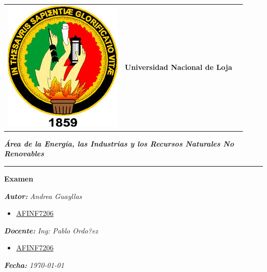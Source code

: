 \documentclass[a4paper,openright,12pt]{report}
\begin{document}
\pagestyle{fancy}
\renewcommand{\headrulewidth}{0pt}
\bigskip
\bigskip


{\setlength{\arrayrulewidth}{0.5mm}
\begin{tabular}{p{2 cm} | p{10
cm} p{3 cm}}
\multirow{3}{2cm}{\Large{\includegraphics[width=1.9 cm]{logtipo}}} 

& \Large{\textbf{Universidad Nacional de Loja}} \\

\end{tabular}
\bigskip
\bigskip

\begin{flushleft}


\raggedright{ 
\small{\textit{\textbf{Área de la Energía, las Industrias y los Recursos Naturales No Renovables}}}
}
\thinspace
\rule{1\textwidth}{0.04cm} 
\thinspace
{}
\end{flushleft}
\bigskip
\bigskip
\bigskip
\bigskip
\bigskip

\begin{center}
\textbf{Examen }
\end{center}


\begin{flushleft}
\textit{\textbf{Autor:}}
\textit{Andrea Guayllas}
\begin{itemize}
\renewcommand{\labelitemi}{$\diamond$} 
\item \href{http://www.iralis.org/?q=node%2F10&paso=10&letra=G&id=7206}{AFINF7206}
\end{itemize}
\bigskip
\end{flushleft}
\thinspace
\bigskip


\begin{flushleft}
\textit{\textbf{Docente:}}
\textit{Ing: Pablo Ordo?ez}
\begin{itemize}
\renewcommand{\labelitemi}{$\diamond$} 
\item \href{http://www.iralis.org/?q=node%2F10&paso=10&letra=O&id=4796}{AFINF7206}
\end{itemize}
\bigskip
\bigskip
\end{flushleft}

\thinspace
\bigskip
\begin{flushleft}
\textit{\textbf{Fecha: }\today{}}
\end{flushleft}
\thinspace
\bigskip

}
\end{document}

